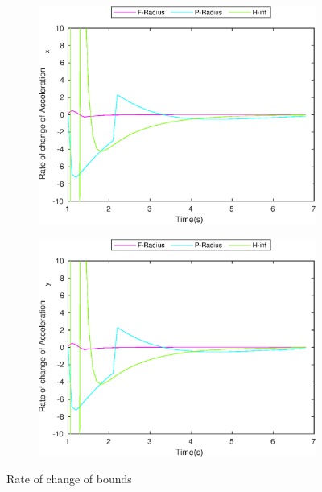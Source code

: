 \begin{figure}[!h]
\begin{subfigure}{.5\linewidth}
\includegraphics[width=.9\linewidth]{figures/BoundChange/CA/ca_bound_changeAcceleration_x}
\end{subfigure}
\begin{subfigure}{.5\linewidth}
\centering
\includegraphics[width=.9\linewidth]{figures/BoundChange/CA/ca_bound_changeAcceleration_y}
\end{subfigure}
\caption{Rate of change of bounds}
\end{figure}

